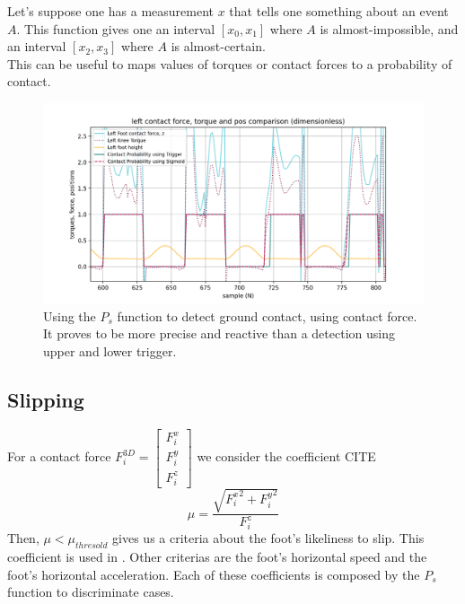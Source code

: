 \documentclass[a4paper,10pt]{article}
\begin{document}
Let's suppose one has a measurement $x$ that tells one something about an event $A$. This function gives one an interval $[x_0, x_1]$ where $A$ is almost-impossible, and an interval $[x_2, x_3]$ where $A$ is almost-certain.\\
This can be useful to maps values of torques or contact forces to a probability of contact.

\begin{figure}[H]
\centering
  \includegraphics[width=\linewidth, angle=0, scale=1.0]{./images/Torque_Contact_Detection_Comp_difficile.png}
  \caption{Using the $P_s$ function to detect ground contact, using contact force. \\ It proves to be more precise and reactive than a detection using upper and lower trigger.}
\end{figure}



\subsection{Slipping}
For a contact force $F_i^{3D} = \begin{bmatrix}F_i^x\\ F_i^y\\ F_i^z \end{bmatrix}$  we consider the coefficient CITE
$$\mu = \frac{\sqrt{ {F_i^x}^{2} + {F_i^y}^{2}}}{F_i^z} $$
Then, $\mu < \mu_{thresold}$ gives us a criteria about the foot's likeliness to slip. This coefficient is used in \cite{9}. 
Other criterias are the foot's horizontal speed and the foot's horizontal acceleration. 
Each of these coefficients is composed by the $P_s$ function to discriminate cases.
\end{document}
